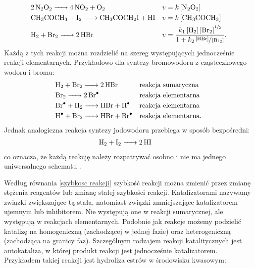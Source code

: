 \documentclass[10pt, a4paper, twoside, onecolumn]{article}
\numberwithin{equation}{section}
\begin{document}
	\begin{align*}
		&\ce{2N2O2 -> 4NO2 + O2} &&v=k\left[\ce{N2O2}\right] \\
		&\ce{CH3COCH3 + I2 -> CH3COCH2I + HI} &&v=k\left[\ce{CH3COCH3}\right] \\
		&\ce{H2 + Br2 -> 2HBr} &&v=\frac{k_{1}\left[\ce{H2}\right]\left[\ce{Br2}\right]^{\sfrac{1}{2}}}{1+k_{2}\sfrac{\left[\ce{HBr}\right]}{\left[\ce{Br2}\right]}}.
	\end{align*}
	Każdą z tych reakcji można rozdzielić na szereg występujących jednocześnie reakcji elementarnych. Przykładowo dla syntezy bromowodoru z cząsteczkowego wodoru i bromu:
	\begin{align*}
		&\ce{H2 + Br2 -> 2HBr} &&\text{reakcja sumaryczna} \\
		&\ce{Br2 -> 2Br^{.}} &&\text{reakcja elementarna} \\
		&\ce{Br^{.} + H2 -> HBr + H^{.}} &&\text{reakcja elementarna} \\
		&\ce{H^{.} + Br2 -> HBr + Br^{.}} &&\text{reakcja elementarna}.
	\end{align*}
	Jednak analogiczna reakcja syntezy jodowodoru przebiega w sposób bezpośredni: 
	\begin{align*}
		&\ce{H2 + I2 -> 2HI}
	\end{align*}
	co oznacza, że każdą reakcję należy rozpatrywać osobno i nie ma jednego uniwersalnego schematu \cite{pigon1}. \par
	
	Według równania \eqref{szybkosc reakcji} szybkość reakcji można zmienić przez zmianę stężenia reagentów lub zmianę stałej szybkości reakcji. Katalizatorami nazywamy związki zwiększające tą stała, natomiast związki zmniejszające katalizatorem ujemnym lub inhibitorem. Nie występują one w reakcji sumarycznej, ale występują w reakcjach elementarnych. Podobnie jak reakcje możemy podzielić katalizę na homogeniczną (zachodzącej w jednej fazie) oraz heterogeniczną (zachodząca na granicy faz). Szczególnym rodzajem reakcji katalitycznych jest autokataliza, w której produkt reakcji jest jednocześnie katalizatorem. Przykładem takiej reakcji jest hydroliza estrów w środowisku kwasowym: \cite{pigon1}
	\begin{center}
	\end{center}
	
\end{document}
